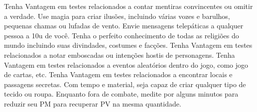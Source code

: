 \vfill
{}
{
	Tenha Vantagem em testes relacionados a contar mentiras convincentes ou omitir a verdade.
}
\vfill
{}
{
	Use magia para criar ilusões, incluindo várias vozes e barulhos, pequenas chamas ou lufadas de vento.
}
\vfill
{}
{
	Envie mensagens telepáticas a qualquer pessoa a 10u de você.
}
\vfill
{}
{
	Tenha o perfeito conhecimento de todas as religiões do mundo incluindo suas divindades, costumes e facções. 
}
\vfill
{}
{
	Tenha Vantagem em testes relacionados a notar emboscadas ou intenções hostis de personagens.
}
\vfill
{}
{
	Tenha Vantagem em testes relacionados a eventos aleatórios dentro do jogo, como jogo de cartas, etc. 
}
\vfill
{}
{
	Tenha Vantagem em testes relacionados a encontrar locais e passagens secretas.
}
\vfill
{}
{
	Com tempo e material, seja capaz de criar qualquer tipo de tecido ou roupa.
}
\vfill
{}
{
	Enquanto fora de combate, medite por alguns minutos para reduzir seu PM para recuperar PV na mesma quantidade.
}
%
\clearpage
